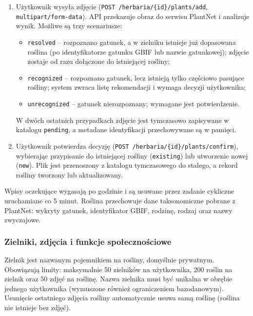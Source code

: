 \documentclass[12pt,a4paper]{article}
\begin{document}
\begin{enumerate}[leftmargin=1.6cm]
    \item U\.zytkownik wysy\l{}a zdj\k{e}cie (\texttt{POST /herbaria/\allowbreak{}\{id\}/\allowbreak{}plants/\allowbreak{}add}, \texttt{multipart/\allowbreak{}form-data}). API przekazuje obraz do serwisu PlantNet i analizuje wynik. Mo\.zliwe s\k{a} trzy scenariusze:
    \begin{itemize}[label=\textbullet, leftmargin=1.2cm]
        \item \texttt{resolved} -- rozpoznano gatunek, a w zielniku istnieje ju\.z dopasowana ro\'slina (po identyfikatorze gatunku GBIF lub nazwie gatunkowej); zdj\k{e}cie zostaje od razu do\l{}\k{a}czone do istniej\k{a}cej ro\'sliny;
        \item \texttt{recognized} -- rozpoznano gatunek, lecz istniej\k{a} tylko cz\k{e}\'sciowo pasuj\k{a}ce ro\'sliny; system zwraca list\k{e} rekomendacji i wymaga decyzji u\.zytkownika;
        \item \texttt{unrecognized} -- gatunek nierozpoznany; wymagane jest potwierdzenie.
    \end{itemize}
    W dwóch ostatnich przypadkach zdj\k{e}cie jest tymczasowo zapisywane w katalogu \texttt{pending}, a metadane identyfikacji przechowywane s\k{a} w pami\k{e}ci.
    \item U\.zytkownik potwierdza decyzj\k{e} (\texttt{POST /herbaria/\{id\}/plants/confirm}), wybieraj\k{a}c przypisanie do istniej\k{a}cej ro\'sliny (\texttt{existing}) lub utworzenie nowej (\texttt{new}). Plik jest przenoszony z katalogu tymczasowego do sta\l{}ego, a rekord ro\'sliny tworzony lub aktualizowany.
\end{enumerate}

Wpisy oczekuj\k{a}ce wygasaj\k{a} po godzinie i s\k{a} usuwane przez zadanie cykliczne uruchamiane co 5 minut. Ro\'slina przechowuje dane taksonomiczne pobrane z PlantNet: wykryty gatunek, identyfikator GBIF, rodzin\k{e}, rodzaj oraz nazwy zwyczajowe.

\subsubsection{Zielniki, zdj\k{e}cia i funkcje spo\l{}eczno\'sciowe}

Zielnik jest nazwanym pojemnikiem na ro\'sliny, domy\'slnie prywatnym. Obowi\k{a}zuj\k{a} limity: maksymalnie 50 zielnik\'ow na u\.zytkownika, 200 ro\'slin na zielnik oraz 50 zdj\k{e}\'c na ro\'slin\k{e}. Nazwa zielnika musi by\'c unikalna w obr\k{e}bie jednego u\.zytkownika (wymuszone r\'ownie\.z ograniczeniem bazodanowym). Usuni\k{e}cie ostatniego zdj\k{e}cia ro\'sliny automatycznie usuwa sam\k{a} ro\'slin\k{e} (ro\'slina nie istnieje bez zdj\k{e}\'c).
\end{document}
